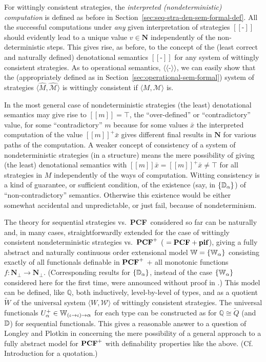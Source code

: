 \documentclass[fleqn]{LMCS}
\theoremstyle{plain}\newtheorem{satz}[thm]{Satz}
\theoremstyle{plain}\newtheorem{hyp}[thm]{Hypothesis}
\theoremstyle{plain}\newtheorem{hyps}[thm]{Hypotheses}
\theoremstyle{definition}\newtheorem{note}[thm]{Note}
\newcommand{\defis}{\mbox{-}}
\newcommand{\setof}[1]{\{#1\}}
\newcommand{\arr}{\rightarrow}
\newcommand{\la}{\langle}
\newcommand{\ra}{\rangle}
\newcommand{\lla}{\langle\!\langle}
\newcommand{\rra}{\rangle\!\rangle}
\newcommand{\Osem}[1]{\lla #1 \rra}
\newcommand{\Dsem}[1]{[\![ #1 ]\!]}
\newcommand{\tuple}[1]{\la #1 \ra}
\newcommand{\NN}{\mathbf{N}}
\newcommand{\bbQ}{\mathbb{Q}}
\newcommand{\PCF}{\mbox{\bf PCF}}
\newcommand{\PIF}{\mbox{\bf pif}}
\newcommand{\MM}{{\mathcal M}}
\newcommand{\bx}{\bar{x}}
\newcommand{\tQ}{\tilde{Q}}
\newcommand{\tW}{\tilde{W}}
\newcommand{\WW}{{\mathcal W}}
\newcommand{\?}{\mbox{?}}
\begin{document}
For wittingly consistent strategies, 
the \emph{interpreted (nondeterministic) computation} is defined as before 
in Section~\ref{sec:seq-stra-den-sem-formal-def}.  
All the successful computations under 
\emph{any} given interpretation of strategies $\Dsem{\defis}$ should 
evidently lead to a unique value $v\in\NN$ independently of 
the non-deterministic steps. This gives rise, as before, to 
the concept of the (least correct and naturally defined) denotational semantics 
$\Dsem{\defis}$ for any system of wittingly consistent strategies. 
As to operational semantics, $\Osem{\defis}$, we can easily show 
that the (appropriately defined as in Section~\ref{sec:operational-sem-formal}) 
system of strategies 
$\tuple{\hat{M},\hat{\MM}}$ is wittingly consistent if 
$\tuple{M,\MM}$ is.

In the most general case of nondeterministic strategies 
(the least) denotational semantics may give rise to $\Dsem{m}=\top$, 
the ``over-defined'' or ``contradictory'' value,  
for some ``contradictory'' $m$ because for some 
values $\bx$ the interpreted computation of the value $\Dsem{m}^+\bx$
gives different final results in $\NN$ for various paths of the computation. 
A weaker concept of consistency \cite{Saz76SMZH,Saz76t} of a system of nondeterministic 
strategies (in a structure) means the mere possibility of giving 
(the least) denotational semantics with $\Dsem{m}\bx=\Dsem{m}^+\bx\ne\top$ 
for all strategies in $M$ independently of the ways of computation. 
Witting consistency is a kind of guarantee, or sufficient condition, of the 
existence (say, in $\setof{\bbD_\alpha}$) of ``non-contradictory'' 
semantics. Otherwise this existence 
would be either somewhat accidental and unpredictable, 
or just fail, because of nondeterminism. 




The theory for sequential strategies vs.\ \PCF\ considered so far can be 
naturally and, in many cases, straightforwardly 
extended for the case of wittingly consistent nondeterministic strategies 
vs.\ $\PCF^+$ (${}= \PCF + \PIF$), 
giving a fully abstract and naturally continuous order extensional 
model $\bbW=\setof{\bbW_\alpha}$ 
consisting exactly of all functionals definable in 
$\PCF^+$ $+$ all monotonic functions 
\mbox{$f:\NN_{\bot}\arr \NN_{\bot}$}. 
(Corresponding results for $\setof{\bbD_\alpha}$, instead of the case 
$\setof{\bbW_\alpha}$ considered here for the first time, 
were announced without proof 
in \cite{Saz76t}.) 
This model can be defined, like $\bbQ$, both inductively, level-by-level 
of types, 
and as a quotient $\tW$ of the universal system $\tuple{W,\WW}$ 
of wittingly consistent strategies. The universal functionals 
$U^+_{\alpha}\in\bbW_{(\iota\arr\iota)\arr\alpha}$ for each type 
can be constructed as for $\bbQ\cong\tQ$ (and $\mathbb{D}$) for sequential functionals. 
This gives a reasonable answer to a 
question of Longley and Plotkin in \cite{Longley-Plotkin} 
concerning the mere possibility of a general approach 
to a fully abstract model for $\PCF^+$ with 
definability properties like the above. 
(Cf. Introduction for a quotation.) 
\end{document}
